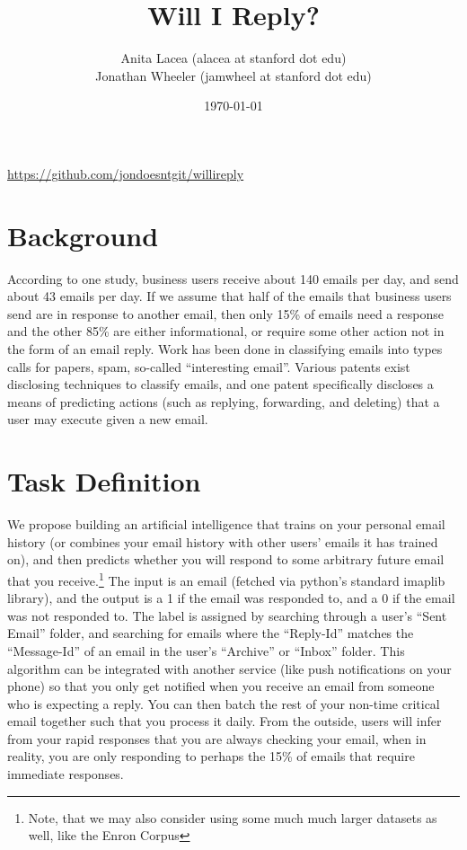 \documentclass{article}
\title{Will I Reply?}
\author{Anita Lacea (alacea at stanford dot edu)\\Jonathan Wheeler (jamwheel at stanford dot edu)}
\date{\today}
\begin{document}
\maketitle
\vspace{-1cm}
\begin{center}
\href{https://github.com/jondoesntgit/willireply}{https://github.com/jondoesntgit/willireply}
\end{center}

\section{Background} 
According to one study, business users receive about 140 emails per day, and send about 43 emails per day.\cite{emailstatistics} If we assume that half of the emails that business users send are in response to another email, then only 15\% of emails need a response and the other 85\% are either informational, or require some other action not in the form of an email reply. Work has been done in classifying emails into types calls for papers\cite{learningrulesthatclassifyemail}, spam\cite{filteringjunkemail}, so-called ``interesting email''\cite{emailclassification}. Various patents exist disclosing techniques to classify emails\cite{Goodman:2014ug,Bellegarda:2010wk,Romero:2005vs}, and one patent specifically discloses a means of predicting actions (such as replying, forwarding, and deleting) that a user may execute given a new email\cite{Weber:2012tv}.

\section{Task Definition}
We propose building an artificial intelligence that trains on your personal email history (or combines your email history with other users' emails it has trained on), and then predicts whether you will respond to some arbitrary future email that you receive.\footnote{Note, that we may also consider using some much much larger datasets as well, like the Enron Corpus\cite{enroncorpus}} The input is an email (fetched via python's standard imaplib library), and the output is a 1 if the email was responded to, and a 0 if the email was not responded to. The label is assigned by searching through a user's ``Sent Email'' folder, and searching for emails where the ``Reply-Id'' matches the ``Message-Id'' of an email in the user's ``Archive'' or ``Inbox'' folder. This algorithm can be integrated with another service (like push notifications on your phone) so that you only get notified when you receive an email from someone who is expecting a reply. You can then batch the rest of your non-time critical email together such that you process it daily. From the outside, users will infer from your rapid responses that you are always checking your email, when in reality, you are only responding to perhaps the 15\% of emails that require immediate responses.
\end{document}
